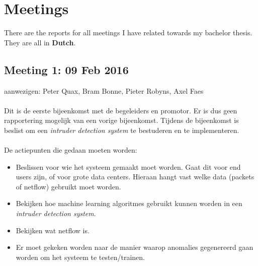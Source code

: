 
\chapter{Meetings} %

\label{AppendixA} %
There are the reports for all meetings I have related towards my bachelor thesis. They are all in \textbf{Dutch}.

\section{Meeting 1: 09 Feb 2016}

aanwezigen: Peter Quax, Bram Bonne, Pieter Robyns, Axel Faes\\
\\
Dit is de eerste bijeenkomst met de begeleiders en promotor. Er is dus geen rapportering mogelijk van een vorige bijeenkomst. Tijdens de bijeenkomst is beslist om een \textit{intruder detection system} te bestuderen en te implementeren. \\
\\
De actiepunten die gedaan moeten worden:
\begin{itemize}  
        \item Beslissen voor wie het systeem gemaakt moet worden. Gaat dit voor end users zijn, of voor grote data centers. Hieraan hangt vast welke data (packets of netflow) gebruikt moet worden.
        \item Bekijken hoe machine learning algoritmes gebruikt kunnen worden in een \textit{intruder detection system}.
        \item Bekijken wat netflow is.
        \item Er moet gekeken worden naar de manier waarop anomalies gegenereerd gaan worden om het systeem te testen/trainen.
\end{itemize}

